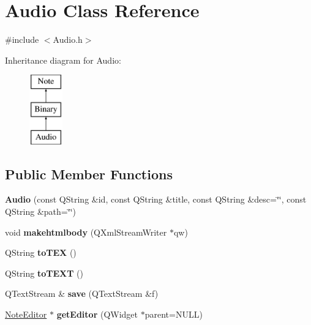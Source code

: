 \hypertarget{classAudio}{\section{\-Audio \-Class \-Reference}
\label{classAudio}
}


{\ttfamily \#include $<$\-Audio.\-h$>$}

\-Inheritance diagram for \-Audio\-:\begin{figure}[H]
\begin{center}
\leavevmode
\includegraphics[height=3.000000cm]{classAudio}
\end{center}
\end{figure}
\subsection*{\-Public \-Member \-Functions}
\begin{DoxyCompactItemize}
\item 
\hypertarget{classAudio_af4e17370a77f7d8e3d9cd177b29677a9}{{\bfseries \-Audio} (const \-Q\-String \&id, const \-Q\-String \&title, const \-Q\-String \&desc=\char`\"{}\char`\"{}, const \-Q\-String \&path=\char`\"{}\char`\"{})}\label{classAudio_af4e17370a77f7d8e3d9cd177b29677a9}

\item 
\hypertarget{classAudio_a0dda4963d5d0ad70915483fc9085560b}{void {\bfseries makehtmlbody} (\-Q\-Xml\-Stream\-Writer $\ast$qw)}\label{classAudio_a0dda4963d5d0ad70915483fc9085560b}

\item 
\hypertarget{classAudio_a3018b17d64f9aef97055fd47fbf5d305}{\-Q\-String {\bfseries to\-T\-E\-X} ()}\label{classAudio_a3018b17d64f9aef97055fd47fbf5d305}

\item 
\hypertarget{classAudio_a7919a8446d5ca66c138cf9d0fa70b106}{\-Q\-String {\bfseries to\-T\-E\-X\-T} ()}\label{classAudio_a7919a8446d5ca66c138cf9d0fa70b106}

\item 
\hypertarget{classAudio_aa288d26d55337269d24f2cd01fdabe38}{\-Q\-Text\-Stream \& {\bfseries save} (\-Q\-Text\-Stream \&f)}\label{classAudio_aa288d26d55337269d24f2cd01fdabe38}

\item 
\hypertarget{classAudio_ab7e8bbe8d18afca4002487da748d05f1}{\hyperlink{classNoteEditor}{\-Note\-Editor} $\ast$ {\bfseries get\-Editor} (\-Q\-Widget $\ast$parent=\-N\-U\-L\-L)}\label{classAudio_ab7e8bbe8d18afca4002487da748d05f1}

\end{DoxyCompactItemize}


